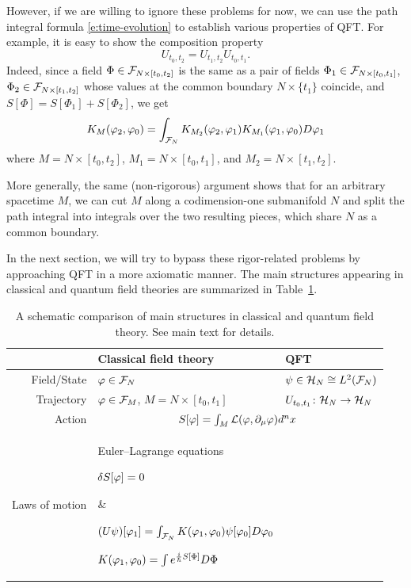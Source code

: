 However, if we are willing to ignore these problems for now, we can
use the path integral formula \eqref{e:time-evolution} to establish various
properties of QFT. For example,
it is easy to show the composition property
\begin{equation*}
U_{t_0,t_2}= U_{t_1,t_2} U_{t_0,t_1}.
\end{equation*}
Indeed, since a field $\Phi\in \mathcal{F}_{N\times [t_0,t_2]}$ is the same as a
pair of fields $\Phi_1\in \mathcal{F}_{N\times [t_0,t_1]}$,
$\Phi_2\in \mathcal{F}_{N\times [t_1,t_2]}$ whose values at the common boundary
$N\times\{t_1\}$ coincide, and $S[\Phi]=S[\Phi_1]+S[\Phi_2]$,  we get
\begin{equation}\label{e:gluing}
  K_M(\varphi_2,\varphi_0) = \int_{\mathcal{F}_N}
  K_{M_2}( \varphi_2,\varphi_1) K_{M_1}(\varphi_1, \varphi_0) D \varphi_1
\end{equation}
where $M=N\times [t_0,t_2]$, $M_1=N\times [t_0,t_1]$, and
$M_2=N\times [t_1,t_2]$.


More generally, the same (non-rigorous) argument shows that for an arbitrary
spacetime $M$, we can cut $M$ along a codimension-one submanifold $N$ and split
the path integral into integrals over the two resulting pieces, which share $N$
as a common boundary.



In the next section, we will try to bypass these rigor-related problems by
approaching QFT in a more axiomatic manner. The main structures appearing
in classical and quantum field theories are summarized in
Table~\ref{tab:qft}.

\begin{table}[h]
	\centering
	\begin{tabular}{|r|l|l|}
		\hline
		&\textbf{Classical field theory} & \textbf{QFT} \\[5pt]
		\hline
		Field/State &$\varphi \in \mathcal{F}_N$
		& $\psi \in \mathcal{H}_N \cong L^2(\mathcal{F}_N)$ \\[5pt]
		Trajectory
		&$\varphi\in \mathcal{F}_{M}$, $M=N\times[t_0, t_1]$
		&$U_{t_0,t_1}\colon \mathcal{H}_N\to \mathcal{H}_N$ \\[5pt]
		Action
		& \multicolumn{2}{c|}{$S[\varphi]=\int_M \mathcal{L}(\varphi, \partial_\mu\varphi) d^{n}x$}
    \\[5pt]
		Laws of motion
		&\parbox[t]{5cm}{Euler--Lagrange equations\par
			\quad $\delta S[\varphi]=0$
		}
		& \parbox[t]{6cm}{
			$(U \psi)[\varphi_1] = \int_{\mathcal{F}_N} K(\varphi_1,\varphi_0) \psi[\varphi_0] D \varphi_0$\par
      $K(\varphi_1,\varphi_0) = \int e^{\frac{i}{\hbar} S[\Phi]} D\Phi$
		}\\
		\hline
	\end{tabular}
	\caption{A schematic comparison of main structures in classical
    and quantum field theory. See main text for details.}
	\label{tab:qft}
\end{table}

